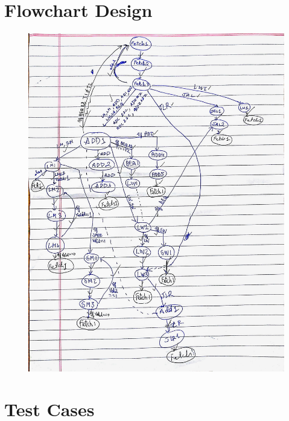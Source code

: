 \documentclass[a4paper,11pt]{article}
\theoremstyle{mytheor}
\begin{document}
\section{Flowchart Design}

\begin{figure}[h!]
  \includegraphics[width=\linewidth]{flow_chart.jpg}
  \label{fig:result1}
\end{figure}



\section{Test Cases}
\end{document}

